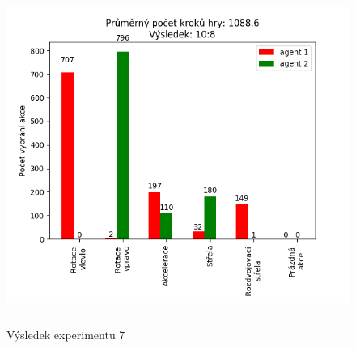\begin{figure}[p]\centering
\includegraphics[width=145mm, height=110mm]{./Obrazky/Experiment07Results.png}
\caption{Výsledek experimentu 7}
\label{Výsledek experimentu 07}
\end{figure}
        